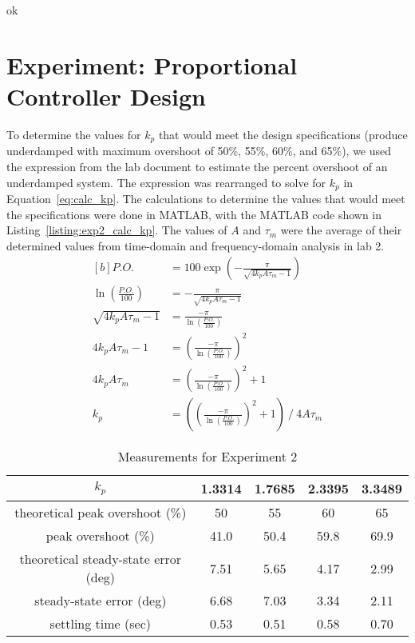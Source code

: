 \documentclass[12pt]{article}
\begin{document}
ok

\section{Experiment: Proportional Controller Design}
To determine the values for $k_p$ that would meet the design specifications (produce underdamped with maximum overshoot of 50\%, 55\%, 60\%, and 65\%), we used the expression from the lab document to estimate the percent overshoot of an underdamped system. The expression was rearranged to solve for $k_p$ in Equation~\ref{eq:calc_kp}. The calculations to determine the values that would meet the specifications were done in MATLAB, with the MATLAB code shown in Listing~\ref{listing:exp2_calc_kp}. The values of $A$ and $\tau_m$ were the average of their determined values from time-domain and frequency-domain analysis in lab 2.
\begin{equation} \label{eq:calc_kp}
\begin{aligned}[b]
    P.O. &= 100\exp\left( -\frac{\pi}{\sqrt{4k_pA\tau_m-1}} \right) \\
    \ln\left(\frac{P.O.}{100}\right) &= -\frac{\pi}{\sqrt{4k_pA\tau_m-1}} \\
    \sqrt{4k_pA\tau_m-1} &= \frac{-\pi}{\ln\left(\frac{P.O.}{100}\right)} \\
    4k_pA\tau_m - 1 &= \left(\frac{-\pi}{\ln\left(\frac{P.O.}{100}\right)}\right)^2 \\
    4k_pA\tau_m &= \left(\frac{-\pi}{\ln\left(\frac{P.O.}{100}\right)}\right)^2 + 1 \\
    k_p &= \left( \left(\frac{-\pi}{\ln\left(\frac{P.O.}{100}\right)}\right)^2 + 1 \right) \ / \ 4A\tau_m
\end{aligned}
\end{equation}



\begin{table}[h!]
\centering
\begin{tabular}{|c|c|c|c|c|} \hline
    $k_p$ & 1.3314 & 1.7685 & 2.3395 & 3.3489 \\ \hline
    theoretical peak overshoot (\%) & 50 & 55 & 60 & 65 \\ \hline
    peak overshoot (\%) & 41.0 & 50.4 & 59.8 & 69.9 \\ \hline
    theoretical steady-state error (deg) & 7.51 & 5.65 & 4.17 & 2.99 \\ \hline
    steady-state error (deg) & 6.68 & 7.03 & 3.34 & 2.11 \\ \hline
    settling time (sec) & 0.53 & 0.51 & 0.58 & 0.70 \\ \hline 
\end{tabular}
\caption{\label{table:exp2_measurements}Measurements for Experiment 2}
\end{table}
\end{document}
